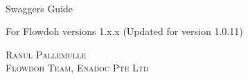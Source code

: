 \begin{titlepage}
    \center
    \HRule \\[0.4cm]
    \fontsize{35.83}{40}\selectfont Swaggers Guide \par 
    { \Large  For Flowdoh versions 1.x.x (Updated for version 1.0.11)}
    \HRule \\[0.5cm]
    \begin{spacing}{2.0}
        \textsc{\Large Ranul Pallemulle}\\ [0.0cm]
        \textsc{\large Flowdoh Team, Enadoc Pte Ltd}\\[2cm]
    \end{spacing}
    \vfill
\end{titlepage}